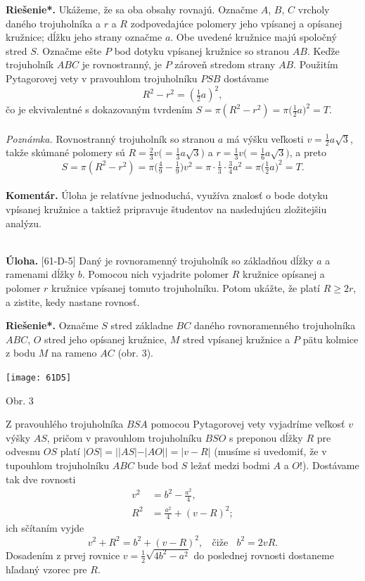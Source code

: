 \documentclass[11pt,a4paper,oneside,final]{book}
\newcommand{\kom}{\textbf{Komentár.} }
\newcommand{\ul}{\textbf{Úloha.} }
\newcommand{\rieh}{\textbf{Riešenie*.} }
\begin{document}
\rieh Ukážeme, že sa oba obsahy rovnajú. Označme $A$, $B$, $C$ vrcholy daného trojuholníka a $r$ a $R$ zodpovedajúce polomery jeho vpísanej a opísanej kružnice; dĺžku jeho strany označme $a$. Obe uvedené kružnice majú spoločný stred $S$. Označme ešte $P$ bod dotyku vpísanej kružnice so stranou $AB$. Keďže trojuholník $ABC$ je rovnostranný, je $P$ zároveň stredom strany $AB$. Použitím Pytagorovej vety v pravouhlom trojuholníku $PSB$ dostávame
$$R^2 - r^2=  (\tfrac{1}{2}a)^2,$$
čo je ekvivalentné s dokazovaným tvrdením $S = \pi (R^2 - r^2) = \pi \big( \frac{1}{2}a\big)^2= T$.\\
\\
\textit{Poznámka.} Rovnostranný trojuholník so stranou $a$ má výšku veľkosti $v = \frac{1}{2}a \sqrt{3}$, takže skúmané polomery sú $R =\frac{2}{3}v \big(=\frac{1}{3}a\sqrt{3}\big)$ a $r =\frac{1}{3}v \big(=\frac{1}{6}a\sqrt{3}\big)$, a preto
$$S = \pi ( R^2 - r^2) = \pi \big( \tfrac{4}{9} -\tfrac{1}{9})v^2= \pi \cdot \tfrac{1}{3}\cdot\tfrac{3}{4}a^2= \pi \big( \tfrac{1}{2}a\big)^2= T.$$
\\
\kom Úloha je relatívne jednoduchá, využíva znalosť o bode dotyku vpísanej kružnice a taktiež pripravuje študentov na nasledujúcu zložitejšiu analýzu. \\
\\
\begin{tcolorbox}[breakable,notitle,boxrule=0pt,colback=light-gray,colframe=light-gray]\ul [61-D-5] Daný je rovnoramenný trojuholník so základňou dĺžky $a$ a ramenami dĺžky $b$. Pomocou nich vyjadrite polomer $R$ kružnice opísanej a polomer $r$ kružnice vpísanej tomuto trojuholníku. Potom ukážte, že platí $R \geq 2r$, a zistite, kedy nastane rovnosť.

\end{tcolorbox}

\rieh Označme $S$ stred základne $BC$ daného rovnoramenného trojuholníka $ABC$, $O$ stred jeho opísanej kružnice, $M$ stred vpísanej kružnice a $P$ pätu kolmice z bodu $M$ na rameno $AC$ (obr. 3).
\begin{center}
\texttt{[image: 61D5]}

Obr. 3
\end{center}
Z pravouhlého trojuholníka $BSA$ pomocou Pytagorovej vety vyjadríme veľkosť $v$ výšky $AS$, pričom v pravouhlom trojuholníku $BSO$ s preponou dĺžky $R$ pre odvesnu $OS$ platí $|OS| =||AS|-|AO|| = |v-R|$ (musíme si uvedomiť, že v tupouhlom trojuholníku $ABC$ bude bod $S$ ležať medzi bodmi $A$ a $O$!). Dostávame tak dve rovnosti
\begin{align*}
v^2 &= b^2 -\frac{a^2}{4},\\
R^2 &= \frac{a^2}{4}+ (v -R)^2;
\end{align*}
ich sčítaním vyjde
$$v^2+ R^2= b^2 + (v - R)^2,\ \ \ \ \text{čiže} \ \ \ \  b^2= 2vR.$$
Dosadením z prvej rovnice $v =\frac{1}{2}\sqrt{4b^2- a^2}$ do poslednej rovnosti dostaneme hľadaný vzorec pre $R$.
\end{document}

